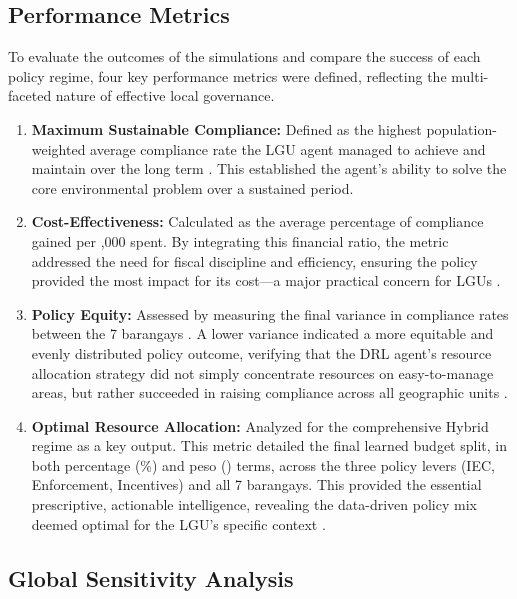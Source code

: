 \subsection{Performance Metrics}
To evaluate the outcomes of the simulations and compare the success of each policy regime, four key performance metrics were defined, reflecting the multi-faceted nature of effective local governance.

\begin{enumerate}
    \item \textbf{Maximum Sustainable Compliance:} Defined as the highest population-weighted average compliance rate the LGU agent managed to achieve and maintain over the long term \citep{ApostolJamoralin2024, Torkayesh2021}. This established the agent's ability to solve the core environmental problem over a sustained period.
    
    \item \textbf{Cost-Effectiveness:} Calculated as the average percentage of compliance gained per ,000 spent. By integrating this financial ratio, the metric addressed the need for fiscal discipline and efficiency, ensuring the policy provided the most impact for its cost—a major practical concern for LGUs \citep{MedinaMijangos2020, WorldBank2022}.
    
    \item \textbf{Policy Equity:} Assessed by measuring the final variance in compliance rates between the 7 barangays \citep{Jimenez2025}. A lower variance indicated a more equitable and evenly distributed policy outcome, verifying that the DRL agent’s resource allocation strategy did not simply concentrate resources on easy-to-manage areas, but rather succeeded in raising compliance across all geographic units \citep{TianReview2024}.
    
    \item \textbf{Optimal Resource Allocation:} Analyzed for the comprehensive Hybrid regime as a key output. This metric detailed the final learned budget split, in both percentage (\%) and peso (\textpeso) terms, across the three policy levers (IEC, Enforcement, Incentives) and all 7 barangays. This provided the essential prescriptive, actionable intelligence, revealing the data-driven policy mix deemed optimal for the LGU's specific context \citep{MuZhang2021, Zhao2022}.
\end{enumerate}

\subsection{Global Sensitivity Analysis}

